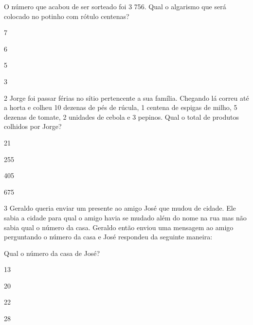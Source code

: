 O número que acabou de ser sorteado foi 3 756. Qual o algarismo que será
colocado no potinho com rótulo centenas?

\begin{escolha}
\item
  7
\item
  6
\item
  5
\item
  3
\end{escolha}


\num{2} Jorge foi passar férias no sítio pertencente a sua família.
Chegando lá correu até a horta e colheu 10 dezenas de pés de rúcula, 1
centena de espigas de milho, 5 dezenas de tomate, 2 unidades de cebola e
3 pepinos. Qual o total de produtos colhidos por Jorge?

\begin{escolha}
\item
  21
\item
  255
\item
  405
\item
  675
\end{escolha}


\num{3} Geraldo queria enviar um presente ao amigo José que mudou de
cidade. Ele sabia a cidade para qual o amigo havia se mudado além do
nome na rua mas não sabia qual o número da casa. Geraldo então enviou
uma mensagem ao amigo perguntando o número da casa e José respondeu da
seguinte maneira:


Qual o número da casa de José?

\begin{escolha}
\item
  13
\item
  20
\item
  22
\item
  28
\end{escolha}


